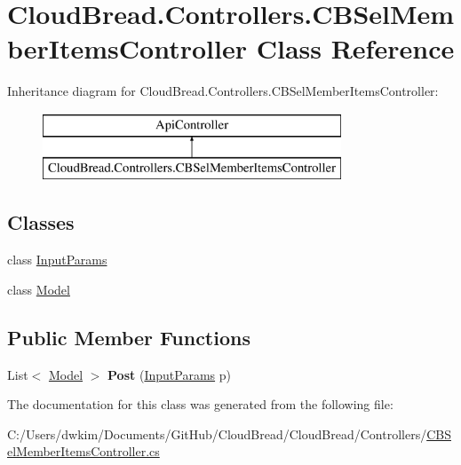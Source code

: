 \hypertarget{a00053}{}\section{Cloud\+Bread.\+Controllers.\+C\+B\+Sel\+Member\+Items\+Controller Class Reference}
\label{a00053}
Inheritance diagram for Cloud\+Bread.\+Controllers.\+C\+B\+Sel\+Member\+Items\+Controller\+:\begin{figure}[H]
\begin{center}
\leavevmode
\includegraphics[height=2.000000cm]{a00053}
\end{center}
\end{figure}
\subsection*{Classes}
\begin{DoxyCompactItemize}
\item 
class \hyperlink{a00098}{Input\+Params}
\item 
class \hyperlink{a00163}{Model}
\end{DoxyCompactItemize}
\subsection*{Public Member Functions}
\begin{DoxyCompactItemize}
\item 
List$<$ \hyperlink{a00163}{Model} $>$ {\bfseries Post} (\hyperlink{a00098}{Input\+Params} p)\hypertarget{a00053_a5e7fe0d95c6b9364f552f15e007f5acd}{}\label{a00053_a5e7fe0d95c6b9364f552f15e007f5acd}

\end{DoxyCompactItemize}


The documentation for this class was generated from the following file\+:\begin{DoxyCompactItemize}
\item 
C\+:/\+Users/dwkim/\+Documents/\+Git\+Hub/\+Cloud\+Bread/\+Cloud\+Bread/\+Controllers/\hyperlink{a00224}{C\+B\+Sel\+Member\+Items\+Controller.\+cs}\end{DoxyCompactItemize}

